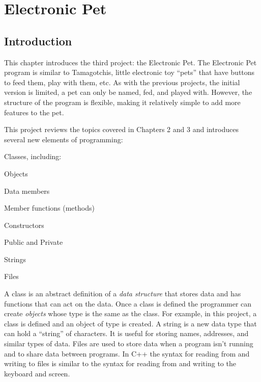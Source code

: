 \chapter{Electronic Pet}\label{ch:pet}

\section{Introduction}

This chapter introduces the third project: the Electronic Pet.  The Electronic Pet program is similar to Tamagotchis, little electronic toy ``pets'' that have buttons to feed them, play with them, etc.  As with the previous projects, the initial version is limited, a pet can only be named, fed, and played with.  However, the structure of the program is flexible, making it relatively simple to add more features to the pet.  

This project reviews the topics covered in Chapters 2 and 3 and introduces several new elements of programming:
\begin{tight_itemize}
\item Classes, including:
\begin{tight_itemize}
\item Objects
\item Data members
\item Member functions (methods)
\item Constructors
\item Public and Private
\end{tight_itemize}
\item Strings 
\item Files
\end{tight_itemize}

 A class is an abstract definition of a \emph{data structure} that stores data and has functions that can act on the data.  Once a class is defined the programmer can create \emph{objects} whose type is the same as the class.  For example, in this project, a  class is defined and an object of type  is created.  A string is a new data type that can hold a ``string'' of characters.  It is useful for storing names, addresses, and similar types of data.  Files are used to store data when a program isn't running and to share data between programs.  In C++ the syntax for reading from and writing to files is similar to the syntax for reading from and writing to the keyboard and screen.

